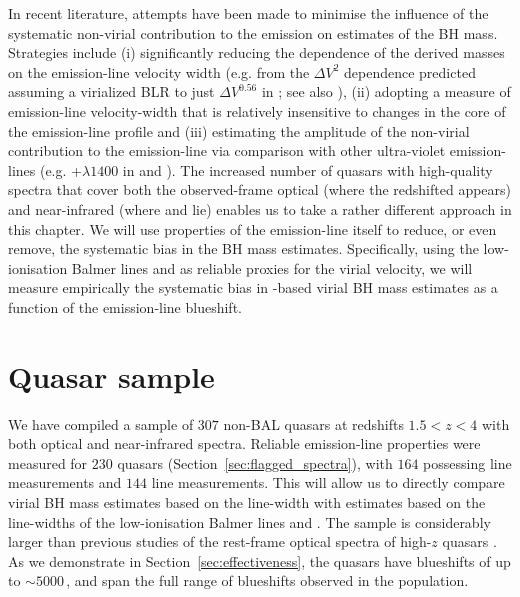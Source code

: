 In recent literature, attempts have been made to minimise the influence of the systematic non-virial contribution to the  emission on estimates of the BH mass. 
Strategies include (i) significantly reducing the dependence of the derived masses on the emission-line velocity width (e.g. from the $\Delta V^2$ dependence predicted assuming a virialized BLR to just $\Delta V^{0.56}$ in \citealt{park13}; see also \citealt{shen12}), (ii) adopting a measure of emission-line velocity-width that is relatively insensitive to changes in the core of the emission-line profile \citep[e.g.][]{denney13} and (iii) estimating the amplitude of the non-virial contribution to the  emission-line via comparison with other ultra-violet emission-lines (e.g. +$\lambda$$1400$ in \citealt{runnoe13} and \citealt{brotherton15}).
The increased number of quasars with high-quality spectra that cover both the observed-frame optical (where the redshifted  appears) and near-infrared (where \hb and \ha lie) enables us to take a rather different approach in this chapter.
We will use properties of the  emission-line itself to reduce, or even remove, the systematic bias in the BH mass estimates. 
Specifically, using the low-ionisation Balmer lines \ha and \hb as reliable proxies for the virial velocity, we will measure empirically the systematic bias in -based virial BH mass estimates as a function of the  emission-line blueshift.

\section{Quasar sample}

We have compiled a sample of $307$ non-BAL quasars at redshifts $1.5 < z < 4$ with both optical and near-infrared spectra.  
Reliable emission-line properties were measured for $230$ quasars (Section~\ref{sec:flagged_spectra}), with $164$ possessing \ha line measurements and $144$ \hb line measurements.  
This will allow us to directly compare virial BH mass estimates based on the  line-width with estimates based on the line-widths of the low-ionisation Balmer lines \ha and \hbns.  
The sample is considerably larger than previous studies of the rest-frame optical spectra of high-$z$ quasars \citep[e.g.][]{shen12}. 
As we demonstrate in Section~\ref{sec:effectiveness}, the quasars have  blueshifts of up to $\sim5000$\,\kms, and span the full range of blueshifts observed in the population. 

